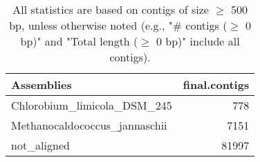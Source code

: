 \documentclass[12pt,a4paper]{article}
\begin{document}
\begin{table}[ht]
\begin{center}
\caption{All statistics are based on contigs of size $\geq$ 500 bp, unless otherwise noted (e.g., "\# contigs ($\geq$ 0 bp)" and "Total length ($\geq$ 0 bp)" include all contigs).}
\begin{tabular}{|l*{1}{|r}|}
\hline
Assemblies & final.contigs \\ \hline
Chlorobium\_limicola\_DSM\_245 & 778 \\ \hline
Methanocaldococcus\_jannaschii & 7151 \\ \hline
not\_aligned & 81997 \\ \hline
\end{tabular}
\end{center}
\end{table}
\end{document}
